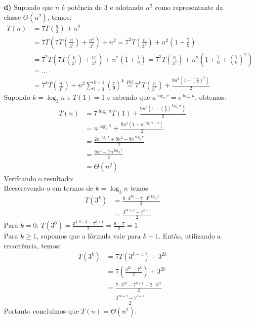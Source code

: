 \documentclass[12pt, a4paper]{article} %
\begin{document}
\begin{enumerate}
\begin{enumerate}
\item[\textbf{d)}]
Supondo que $n$ é potência de 3 e adotando $n^2$ como representante da classe
$\Theta(n^2)$, temos:
\begin{align*}
T(n) &= 7T\left(\frac{n}{3}\right) + n^2\\
     &= 7T\left(7T\left(\frac{n}{3^2}\right) + \frac{n^2}{3^2}\right) + n^2 = 7^2T\left(\frac{n}{3^2}\right) + n^2\left(1 + \frac{7}{9}\right)\\
     &= 7^2T\left(7T\left(\frac{n}{3^3}\right) + \frac{n^2}{3^4}\right) + n^2\left(1 + \frac{7}{9}\right) = 7^3T\left(\frac{n}{3^3}\right) + n^2\left(1 + \frac{7}{9} + \left(\frac{7}{9}\right)^2\right)\\
     &= ...\\
     &= 7^kT\left(\frac{n}{3^k}\right) + n^2\sum_{i=0}^{k-1}\left(\frac{7}{9}\right)^k \stackrel{PG}{=} 7^kT\left(\frac{n}{3^k}\right) + \frac{9n^2\left(1-\left(\frac{7}{9}\right)^k\right)}{2}
\end{align*}
Supondo $k = \log_3 n$ e $T(1) = 1$ e sabendo que $a^{\log_b c} = c^{\log_b a}$, obtemos:
\begin{align*}
T(n) &= 7^{\log_3 n}T(1) + \frac{9n^2\left(1-\left(\frac{7}{9}\right)^{\log_3 n}\right)}{2}\\
     &= n^{\log_3 7} + \frac{9n^2(1-n^{\log_3 7 - 2})}{2}\\
     &= \frac{2n^{\log_3 7} + 9n^2 - 9n^{\log_3 7}}{2}\\
     &= \frac{9n^2 - 7n^{\log_3 7}}{2}\\
     &= \Theta(n^2)
\end{align*}
Verifcando o resultado:\\
Reescrevendo-o em termos de $k = \log_3 n$ temos
\begin{align*}
T(3^k) &= \frac{9\cdot 3^{2k} - 7\cdot 3^{k\log_3 7}}{2}\\
       &= \frac{3^{2k+2} - 7^{k+1}}{2}
\end{align*}
Para $k = 0$: $T(3^0) = \frac{3^{2\cdot 0 + 2} - 7^{0+1}}{2} = \frac{9 - 7}{2} = 1$\\
Para $k \geqslant 1$, supomos que a fórmula vale para $k - 1$. Então, utilizando
a recorrência, temos:
\begin{align*}
T(3^k) &= 7T(3^{k-1}) + 3^{2k}\\
       &= 7\left(\frac{3^{2k} - 7^k}{2}\right) + 3^{2k}\\
       &= \frac{7\cdot 3^{2k} - 7^{k+1} + 2\cdot 3^{2k}}{2} \\
       &= \frac{3^{2k + 2} - 7^{k+1}}{2}
\end{align*}
Portanto concluímos que $T(n) = \Theta(n^2)$.
\end{enumerate}


\end{enumerate}
\end{document}
